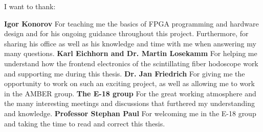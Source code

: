 \thispagestyle{empty}
\vspace*{2cm}
I want to thank:

\medskip
\noindent
\textbf{Igor Konorov} 
\newline
For teaching me the basics of FPGA programming and hardware design and for his ongoing guidance throughout this project.
\newline
Furthermore, for sharing his office as well as his knowledge and time with me when answering my many questions.
\newline
\textbf{Karl Eichhorn and Dr. Martin Losekamm} 
\newline
For helping me understand how the frontend electronics of the scintillating fiber hodoscope work and supporting me during this thesis.
\newline
\textbf{Dr. Jan Friedrich}
\newline
For giving me the opportunity to work on such an exciting project, as well as allowing me to work in the AMBER group.
\newline
\textbf{The E-18 group}
\newline
For the great working atmosphere and the many interesting meetings and discussions that furthered my understanding and knowledge.
\newline
\textbf{Professor Stephan Paul}
\newline
For welcoming me in the E-18 group and taking the time to read and correct this thesis.
